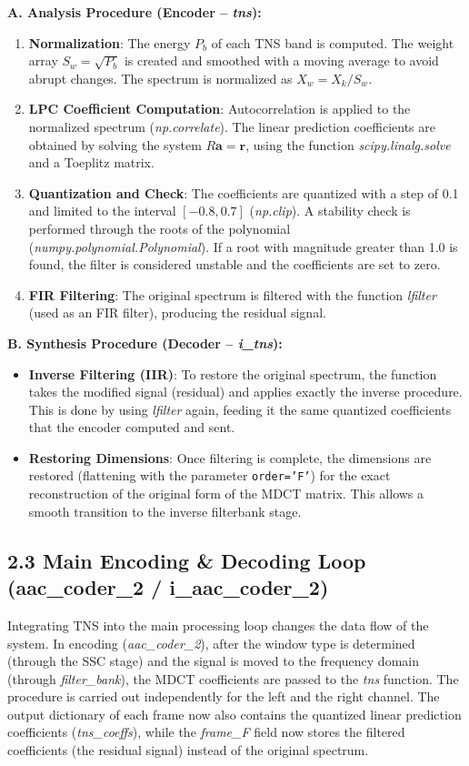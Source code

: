 \documentclass[11pt,twocolumn]{article}
\newcommand{\fn}[1]{\textit{#1}}
\newcommand{\sub}[1]{\subsection*{#1}}
\begin{document}
\textbf{A. Analysis Procedure (Encoder -- \fn{tns}):}
\begin{enumerate}
  \item \textbf{Normalization}: The energy $P_b$ of each TNS band is computed. The weight array $S_w=\sqrt{P_b}$ is created and smoothed with a moving average to avoid abrupt changes. The spectrum is normalized as $X_w = X_k / S_w$.
  \item \textbf{LPC Coefficient Computation}: Autocorrelation is applied to the normalized spectrum (\fn{np.correlate}). The linear prediction coefficients are obtained by solving the system $R\mathbf{a}=\mathbf{r}$, using the function \fn{scipy.linalg.solve} and a Toeplitz matrix.
  \item \textbf{Quantization and Check}: The coefficients are quantized with a step of 0.1 and limited to the interval $[-0.8, 0.7]$ (\fn{np.clip}). A stability check is performed through the roots of the polynomial (\fn{numpy.polynomial.Polynomial}). If a root with magnitude greater than 1.0 is found, the filter is considered unstable and the coefficients are set to zero.
  \item \textbf{FIR Filtering}: The original spectrum is filtered with the function \fn{lfilter} (used as an FIR filter), producing the residual signal.
\end{enumerate}

\textbf{B. Synthesis Procedure (Decoder -- \fn{i\_tns}):}
\begin{itemize}
  \item \textbf{Inverse Filtering (IIR)}: To restore the original spectrum, the function takes the modified signal (residual) and applies exactly the inverse procedure. This is done by using \fn{lfilter} again, feeding it the same quantized coefficients that the encoder computed and sent.
  \item \textbf{Restoring Dimensions}: Once filtering is complete, the dimensions are restored (flattening with the parameter \texttt{order='F'}) for the exact reconstruction of the original form of the MDCT matrix. This allows a smooth transition to the inverse filterbank stage.
\end{itemize}

\sub{2.3 Main Encoding \& Decoding Loop (aac\_coder\_2 / i\_aac\_coder\_2)}
Integrating TNS into the main processing loop changes the data flow of the system. In encoding (\fn{aac\_coder\_2}), after the window type is determined (through the SSC stage) and the signal is moved to the frequency domain (through \fn{filter\_bank}), the MDCT coefficients are passed to the \fn{tns} function. The procedure is carried out independently for the left and the right channel. The output dictionary of each frame now also contains the quantized linear prediction coefficients (\fn{tns\_coeffs}), while the \fn{frame\_F} field now stores the filtered coefficients (the residual signal) instead of the original spectrum.
\end{document}
